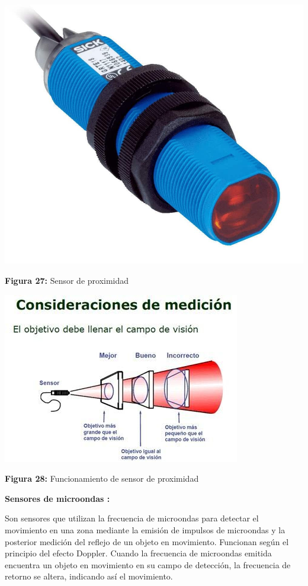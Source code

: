\begin{center}
	\includegraphics[width=0.4\linewidth, height=0.3\textwidth]{img/proximidad}
	
	\vspace{2mm} %
	
	\textbf{Figura 27:} Sensor de proximidad
\end{center}

\vspace{5mm} %

\begin{center}
	\includegraphics[width=0.4\linewidth]{img/Ssensorproximidad}
	
	\vspace{2mm} %
	
	\textbf{Figura 28:} Funcionamiento de sensor de proximidad
\end{center}

\vspace{10mm}
\textbf{Sensores de microondas : }

Son sensores que utilizan la frecuencia de microondas para detectar el movimiento en una zona mediante la emisión de impulsos de microondas y la posterior medición del reflejo de un objeto en movimiento. Funcionan según el principio del efecto Doppler. Cuando la frecuencia de microondas emitida encuentra un objeto en movimiento en su campo de detección, la frecuencia de retorno se altera, indicando así el movimiento.

\vspace{5mm}

